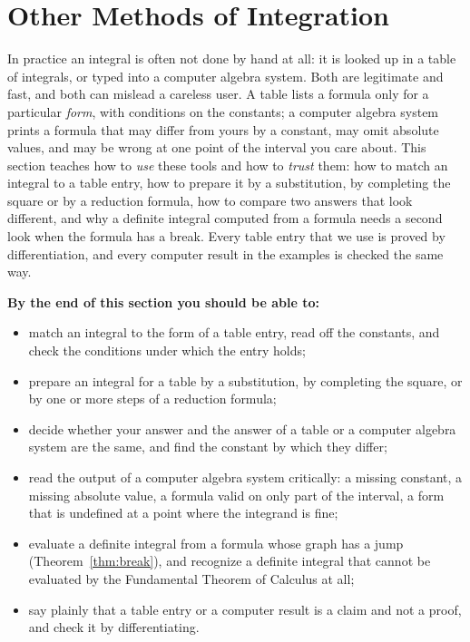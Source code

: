 \documentclass[11pt]{article}
\begin{document}
\section{Other Methods of Integration}

\begin{guide}
In practice an integral is often not done by hand at all: it is looked up in a table of integrals, or typed into a computer algebra system. Both are legitimate and fast, and both can mislead a careless user. A table lists a formula only for a particular \emph{form}, with conditions on the constants; a computer algebra system prints a formula that may differ from yours by a constant, may omit absolute values, and may be wrong at one point of the interval you care about. This section teaches how to \emph{use} these tools and how to \emph{trust} them: how to match an integral to a table entry, how to prepare it by a substitution, by completing the square or by a reduction formula, how to compare two answers that look different, and why a definite integral computed from a formula needs a second look when the formula has a break. Every table entry that we use is proved by differentiation, and every computer result in the examples is checked the same way.
\end{guide}

\textbf{By the end of this section you should be able to:}
\begin{itemize}
  \item match an integral to the form of a table entry, read off the constants, and check the conditions under which the entry holds;
  \item prepare an integral for a table by a substitution, by completing the square, or by one or more steps of a reduction formula;
  \item decide whether your answer and the answer of a table or a computer algebra system are the same, and find the constant by which they differ;
  \item read the output of a computer algebra system critically: a missing constant, a missing absolute value, a formula valid on only part of the interval, a form that is undefined at a point where the integrand is fine;
  \item evaluate a definite integral from a formula whose graph has a jump (Theorem~\ref{thm:break}), and recognize a definite integral that cannot be evaluated by the Fundamental Theorem of Calculus at all;
  \item say plainly that a table entry or a computer result is a claim and not a proof, and check it by differentiating.
\end{itemize}
\end{document}

